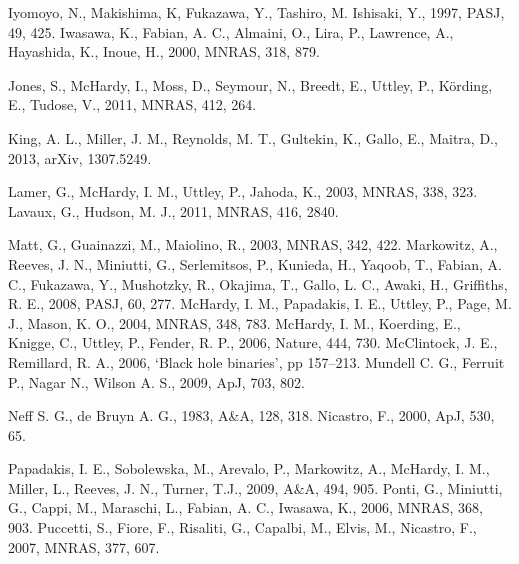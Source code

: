 \documentclass[letters,useAMS,usenatbib]{samnote}
\begin{document}
\begin{thebibliography}{99}
     Iyomoyo, N., Makishima, K, Fukazawa, Y., Tashiro, M. Ishisaki, Y., 1997, PASJ, 49, 425.
     Iwasawa, K., Fabian, A. C., Almaini, O., Lira, P., Lawrence, A., Hayashida, K., Inoue, H., 2000,
MNRAS, 318, 879.
    
     Jones, S.,  McHardy, I., Moss, D., Seymour, N., Breedt, E., Uttley, P., K\"{o}rding, E., Tudose, V.,
2011, MNRAS, 412, 264.

     King, A. L., Miller, J. M., Reynolds, M. T., Gultekin, K., Gallo, E., Maitra, D., 2013, arXiv, 1307.5249.
    
     Lamer, G., McHardy, I. M., Uttley, P., Jahoda, K., 2003, MNRAS, 338, 323.
     Lavaux, G., Hudson, M. J., 2011, MNRAS, 416, 2840.
    
     Matt, G., Guainazzi, M., Maiolino, R., 2003, MNRAS, 342, 422.
     Markowitz, A., Reeves, J. N., Miniutti, G., Serlemitsos, P., Kunieda, H., Yaqoob, T., Fabian, A.
    C., Fukazawa, Y., Mushotzky, R., Okajima, T., Gallo, L. C., Awaki, H., Griffiths, R. E., 2008, PASJ, 60, 277.
     McHardy, I. M., Papadakis, I. E., Uttley, P., Page, M. J., Mason, K. O., 2004, MNRAS, 348, 783.
     McHardy, I. M., Koerding, E., Knigge, C., Uttley, P., Fender, R. P., 2006, Nature, 444, 730.
     McClintock, J. E., Remillard, R. A., 2006, `Black hole binaries', pp 157–213.
     Mundell C. G., Ferruit P., Nagar N., Wilson A. S., 2009, ApJ, 703, 802.
    
     Neff S. G., de Bruyn A. G., 1983, A\&A, 128, 318.
     Nicastro, F., 2000, ApJ, 530, 65.
    
     Papadakis, I. E., Sobolewska,  M., Arevalo,  P., Markowitz, A., McHardy, I. M., Miller,  L.,
    Reeves, J. N., Turner, T.J., 2009, A\&A, 494, 905.
     Ponti, G., Miniutti, G., Cappi, M., Maraschi, L., Fabian, A. C., Iwasawa, K., 2006, MNRAS, 368, 903.
     Puccetti, S., Fiore, F., Risaliti, G., Capalbi, M., Elvis, M., Nicastro, F., 2007, MNRAS, 377, 607.
    

\end{thebibliography}
\end{document}
